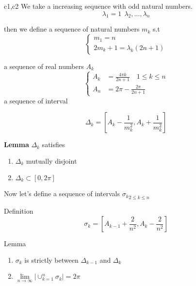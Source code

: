 \documentclass{beamer}
\begin{document}
\begin{frame}{c1,c2}
    We take a increasing sequence with odd natural numbers.
\[ \lambda_1=1 \ \  \lambda_2,\dots,\lambda_n \] 

then we define a sequence of natural numbers $ m_k $ s.t
\[
    \begin{cases}
    m_1=n   \\
    2m_k+1 =\lambda_k(2n+1) 
\end{cases} 
\]

a sequence of real numbers $ A_k $
\[
\begin{cases}
    A_k &=\frac{4\pi k}{2n+1}\quad 1 \leqslant k \leqslant n \\
    A_n&= 2\pi- \frac{2\pi}{2n+1}
\end{cases}
\]
a sequence of interval 

\[ \Delta_k=[A_k-\frac{1}{m_k^2},A_k+\frac{1}{m^2_k}] \]
\end{frame}
\begin{frame}

    \begin{block}{\textbf{Lemma}} 
        $ \Delta_k   $ satisfies
        \begin{enumerate}
            \item $ \Delta_k$ mutually disjoint
            \item $ \Delta_k \subset [0,2\pi] $
        \end{enumerate}
    \end{block}
        Now let's define a sequence of intervals $ {\sigma_k}_{2 \leqslant k \leqslant n} $
        \begin{block}{Definition}
            \[ \sigma_k=[A_{k-1}+\frac{2}{n^2},A_k-\frac{2}{n^2}] \]
        \end{block}
        \begin{block}{Lemma}
            \begin{enumerate}
                \item $ \sigma_k $ is strictly between $ \Delta_{k-1} $  and $ \Delta_k $
                \item $ \lim\limits_{n\rightarrow \infty} |\cup_{k=1}^n\sigma_k|= 2\pi  $
            \end{enumerate}
        \end{block}
    
       

    
\end{frame}
\end{document}
